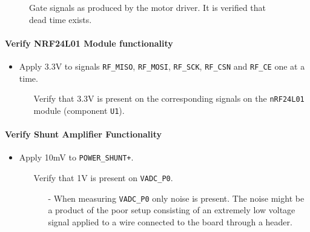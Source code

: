 \begin{figure}[h]
	\centering
	\caption{Gate signals as produced by the motor driver. It is verified that dead time exists.}
	\label{fig:controllerboardv2_gate_b_deadtime}
\end{figure}

\paragraph{Verify NRF24L01 Module functionality} %
\label{par:verify_nrf24l01_module_functionality}
\begin{itemize}
	\item Apply 3.3V to signals \texttt{RF\_MISO}, \texttt{RF\_MOSI}, \texttt{RF\_SCK}, \texttt{RF\_CSN} and \texttt{RF\_CE} one at a time.
	\begin{itemize}
		\item[\cmark] Verify that 3.3V is present on the corresponding signals on the \texttt{nRF24L01} module (component \texttt{U1}).
	\end{itemize}
\end{itemize}

\paragraph{Verify Shunt Amplifier Functionality} %
\label{par:verify_shunt_amplifier_functionality}
\begin{itemize}
	\item Apply 10mV to \texttt{POWER\_SHUNT+}.
	\begin{itemize}
		\item[\xmark] Verify that 1V is present on \texttt{VADC\_P0}.
		\begin{itemize}
			\item[-] When measuring \texttt{VADC\_P0} only noise is present. 
			The noise might be a product of the poor setup consisting of an extremely low voltage signal applied to a wire connected to the board through a header. 
		\end{itemize}
	\end{itemize}
\end{itemize}


